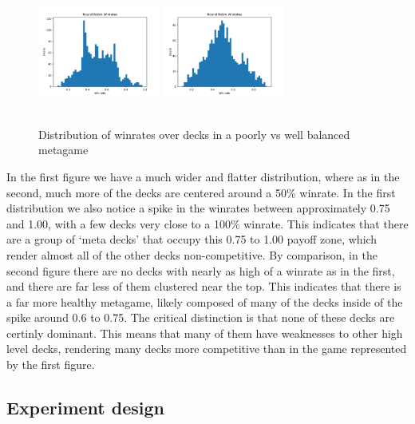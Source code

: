 \begin{figure}[t]
	\includegraphics[width=4cm, height=4cm]{special_only_4_5_8_8_4_8_3_3_3_5}
	\includegraphics[width=4cm, height=4cm]{special_only_1_3_4_3_3_1_7_8_5_7}
	\caption{Distribution of winrates over decks in a poorly vs well balanced metagame}
	\label{fig:special_only_dist}
\end{figure}

In the first figure we have a much wider and flatter distribution, where as in the second, much more of the decks are centered around a 50\% winrate. In the first distribution we also notice a spike in the winrates between approximately 0.75 and 1.00, with a few decks very close to a 100\% winrate. This indicates that there are a group of `meta decks' that occupy this 0.75 to 1.00 payoff zone, which render almost all of the other decks non-competitive. By comparison, in the second figure there are no decks with nearly as high of a winrate as in the first, and there are far less of them clustered near the top. This indicates that there is a far more healthy metagame, likely composed of many of the decks inside of the spike around 0.6 to 0.75. The critical distinction is that none of these decks are certinly dominant. This means that many of them have weaknesses to other high level decks, rendering many decks more competitive than in the game represented by the first figure. 

\subsection{Experiment design}


